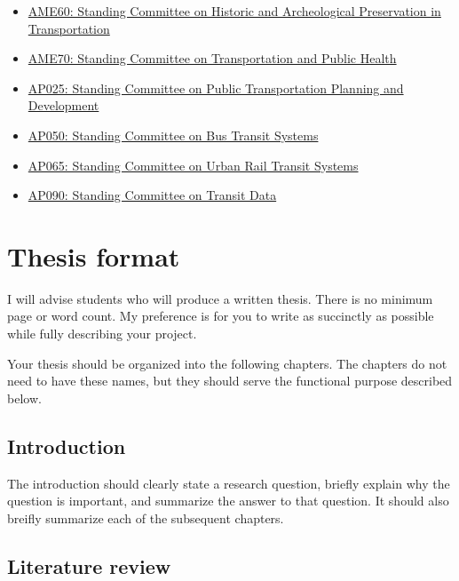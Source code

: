 \documentclass[
]{book}
\begin{document}
\begin{itemize}
\item
  \href{https://www.mytrb.org/OnlineDirectory/Committee/Details/5205}{AME60: Standing Committee on Historic and Archeological Preservation in Transportation}
\item
  \href{https://www.mytrb.org/OnlineDirectory/Committee/Details/5200}{AME70: Standing Committee on Transportation and Public Health}
\item
  \href{https://www.mytrb.org/OnlineDirectory/Committee/Details/1152}{AP025: Standing Committee on Public Transportation Planning and Development}
\item
  \href{https://www.mytrb.org/OnlineDirectory/Committee/Details/6305}{AP050: Standing Committee on Bus Transit Systems}
\item
  \href{https://www.mytrb.org/OnlineDirectory/Committee/Details/1154}{AP065: Standing Committee on Urban Rail Transit Systems}
\item
  \href{https://www.mytrb.org/OnlineDirectory/Committee/Details/6433}{AP090: Standing Committee on Transit Data}
\end{itemize}

\hypertarget{thesis-format}{%
\chapter{Thesis format}\label{thesis-format}}

I will advise students who will produce a written thesis. There is no minimum page or word count. My preference is for you to write as succinctly as possible while fully describing your project.

Your thesis should be organized into the following chapters. The chapters do not need to have these names, but they should serve the functional purpose described below.

\hypertarget{introduction-1}{%
\section{Introduction}\label{introduction-1}}

The introduction should clearly state a research question, briefly explain why the question is important, and summarize the answer to that question. It should also breifly summarize each of the subsequent chapters.

\hypertarget{literature-review}{%
\section{Literature review}\label{literature-review}}
\end{document}
